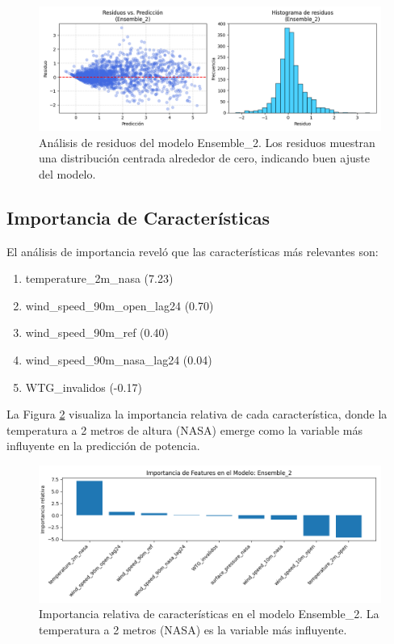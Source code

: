 \documentclass[conference]{IEEEtran}
\begin{document}
	\begin{figure}[htbp]
		\centering
		\includegraphics[width=0.9\linewidth]{images/Figure_3.png}
		\caption{Análisis de residuos del modelo Ensemble\_2. Los residuos muestran una distribución centrada alrededor de cero, indicando buen ajuste del modelo.}
		\label{fig:residuos_mejor_modelo}
	\end{figure}
	
	\subsection{Importancia de Características}
	El análisis de importancia reveló que las características más relevantes son:
	\begin{enumerate}
		\item temperature\_2m\_nasa (7.23)
		\item wind\_speed\_90m\_open\_lag24 (0.70)
		\item wind\_speed\_90m\_ref (0.40)
		\item wind\_speed\_90m\_nasa\_lag24 (0.04)
		\item WTG\_invalidos (-0.17)
	\end{enumerate}
	
	La Figura \ref{fig:importancia_caracteristicas} visualiza la importancia relativa de cada característica, donde la temperatura a 2 metros de altura (NASA) emerge como la variable más influyente en la predicción de potencia.
	
	\begin{figure}[htbp]
		\centering
		\includegraphics[width=0.8\linewidth]{images/Figure_6.png}
		\caption{Importancia relativa de características en el modelo Ensemble\_2. La temperatura a 2 metros (NASA) es la variable más influyente.}
		\label{fig:importancia_caracteristicas}
	\end{figure}
	
\end{document}
